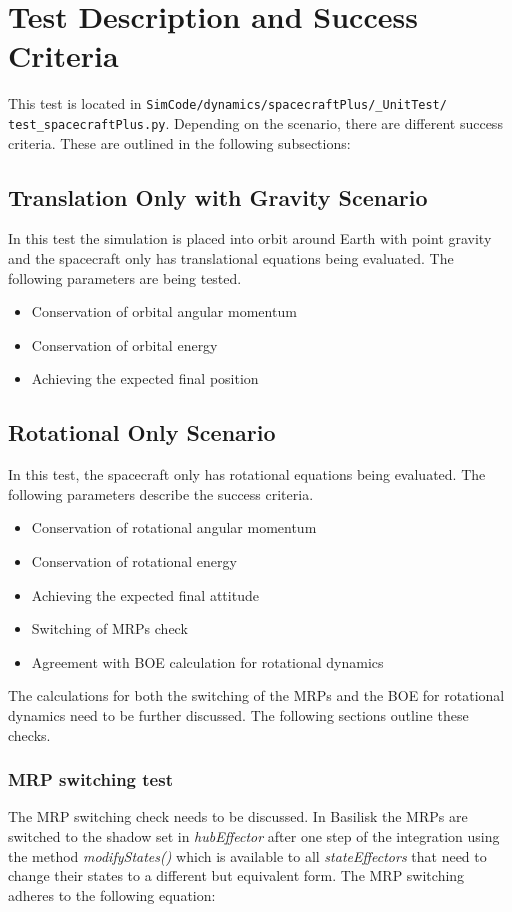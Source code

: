 
\section{Test Description and Success Criteria}
This test is located in \texttt{SimCode/dynamics/spacecraftPlus/\_UnitTest/\newline
test\_spacecraftPlus.py}. Depending on the scenario, there are different success criteria. These are outlined in the following subsections:
\subsection{Translation Only with Gravity Scenario}
In this test the simulation is placed into orbit around Earth with point gravity and the spacecraft only has translational equations being evaluated. The following parameters are being tested. 
\begin{itemize}
	\item Conservation of orbital angular momentum
	\item Conservation of orbital energy
	\item Achieving the expected final position
\end{itemize}

\subsection{Rotational Only Scenario}
In this test, the spacecraft only has rotational equations being evaluated. The following parameters describe the success criteria.
\begin{itemize}
\item Conservation of rotational angular momentum
\item Conservation of rotational energy
\item Achieving the expected final attitude
\item Switching of MRPs check
\item Agreement with BOE calculation for rotational dynamics
\end{itemize}
The calculations for both the switching of the MRPs and the BOE for rotational dynamics need to be further discussed. The following sections outline these checks.

\subsubsection{MRP switching test} 
The MRP switching check needs to be discussed. In Basilisk the MRPs are switched to the shadow set in \textit{hubEffector} after one step of the integration using the method \textit{modifyStates()} which is available to all \textit{stateEffectors} that need to change their states to a different but equivalent form. The MRP switching adheres to the following equation\cite{schaub}:

